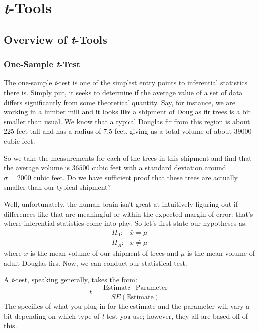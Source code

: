 
\chapter{\textit{t}-Tools}

\section{Overview of \textit{t}-Tools}

\subsection{One-Sample \textit{t}-Test}

The one-sample \textit{t}-test   is one of the simplest entry points to inferential statistics there is. Simply put, it seeks to determine if the average value of a set of data differs significantly from some theoretical quantity. Say, for instance, we are working in a lumber mill and it looks like a shipment of Douglas fir trees is a bit smaller than usual. We know that a typical Douglas fir from this region is about 225 feet tall and has a radius of 7.5 feet, giving us a total volume of about $39000$ cubic feet.

So we take the measurements for each of the trees in this shipment and find that the average volume is $36500$ cubic feet with a standard deviation around $\sigma = 2000$ cubic feet. Do we have sufficient proof that these trees are actually smaller than our typical shipment?

Well, unfortunately, the human brain isn't great at intuitively figuring out if differences like that are meaningful or within the expected margin of error: that's where inferential statistics come into play. So let's first state our hypotheses as:
\begin{eqnarray*}
H_0:& \bar{x} = \mu\\
H_A:& \bar{x} \neq \mu
\end{eqnarray*}
where $\bar{x}$ is the mean volume of our shipment of trees and $\mu$ is the mean volume of adult Douglas firs. Now, we can conduct our statistical test.

A \textit{t}-test, speaking generally, takes the form:
\begin{equation}
t = \frac{\text{Estimate}-\text{Parameter}}{SE(\text{Estimate})}
\end{equation}
The specifics of what you plug in for the estimate and the parameter will vary a bit depending on which type of \textit{t}-test you use; however, they all are based off of this.

